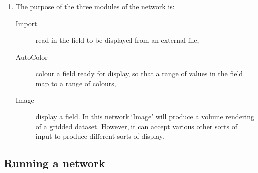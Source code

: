\begin{enumerate}
\begin{enumerate}
    \item The `Filter' box at the top of the window controls the files
     available for selection. It contains a wild-card file expression
     and all the files which match the expression are available for
     selection. Click on this box and enter:

    \begin{quote}
     {\tt /star/examples/sc2}
    \end{quote}

     A list of networks should appear in the `Files' box on the right
     hand side of the window. By convention DX networks have file type
     `{\tt .net}'.

    \item Click on file `{\tt simple.net}' in this box. The full file
     name and directory specification of the {\tt simple} network should
     now appear in the `Selection' window.

    \item Click on the `OK' button. The `Open\ldots' window closes and
     the network is loaded onto the canvas.

  \end{enumerate}

   The network is now ready for use.

  \item The purpose of the three modules of the network is:

  \begin{description}

    \item[Import] read in the field to be displayed from an external
     file,

    \item[AutoColor] colour a field ready for display, so that a range
     of values in the field map to a range of colours,

    \item[Image] display a field. In this network `Image' will produce a
     volume rendering of a gridded dataset. However, it can accept
     various other sorts of input to produce different sorts of display.

  \end{description}
   
\end{enumerate}

\subsection{\label{RUNNET}Running a network}


